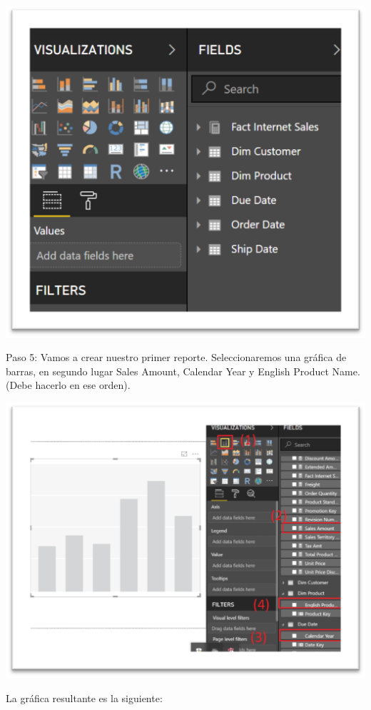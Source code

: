 \documentclass[12pt,letterpaper]{article}
\begin{document}
\begin{center}
    \includegraphics[width=16cm]{img/5.png}  
\end{center}
Paso 5: Vamos a crear nuestro primer reporte. Seleccionaremos una gráfica de barras, en segundo lugar Sales Amount, Calendar Year y English Product Name. (Debe hacerlo en ese orden).
\begin{center}
    \includegraphics[width=16cm]{img/6.png}  
\end{center}
La gráfica resultante es la siguiente:
\end{document}
